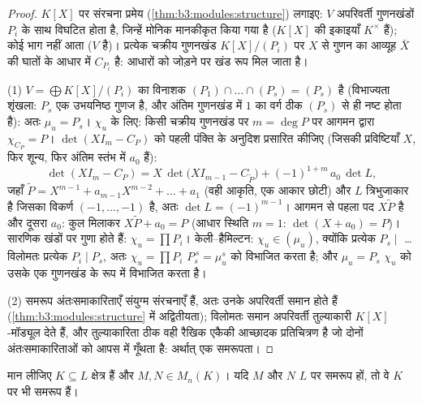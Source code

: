 \begin{proof}
 $K[X]$ पर संरचना प्रमेय (\cref{thm:b3:modules:structure}) लगाइए:  $V$
अपरिवर्ती गुणनखंडों $P_i$ के साथ विघटित होता है, जिन्हें मोनिक
मानकीकृत किया गया है ($K[X]$ की इकाइयाँ $K^\times$ हैं); कोई 
भाग नहीं आता ($V$  है)। प्रत्येक चक्रीय गुणनखंड $K[X]/(P_i)$ पर
$X$ से गुणन का आव्यूह $\bar X$ की घातों के आधार में $C_{P_i}$ है:
आधारों को जोड़ने पर खंड रूप मिल जाता है।

(1) $V = \bigoplus K[X]/(P_i)$ का विनाशक $(P_1)\cap
\dots\cap(P_s) = (P_s)$ है (विभाज्यता शृंखला: $P_s$ एक
उभयनिष्ठ गुणज है, और अंतिम गुणनखंड में $1$ का वर्ग ठीक $(P_s)$
से ही नष्ट होता है): अतः $\mu_u = P_s$। $\chi_u$ के लिए: किसी चक्रीय गुणनखंड
पर $m = \deg P$ पर आगमन द्वारा $\chi_{C_P} = P$। $\det(XI_m - C_P)$ को पहली पंक्ति के अनुदिश
प्रसारित कीजिए (जिसकी प्रविष्टियाँ $X$, फिर शून्य, फिर अंतिम
स्तंभ में $a_0$ हैं):
\[
\det(XI_m - C_P) = X\,\det\bigl(XI_{m-1} - C_{\tilde P}\bigr)
+ (-1)^{1+m}\,a_0\,\det L ,
\]
जहाँ $\tilde P = X^{m-1} + a_{m-1}X^{m-2} + \dots + a_1$ (वही आकृति, एक आकार छोटी) और $L$ त्रिभुजाकार है
जिसका विकर्ण $(-1, \dots, -1)$ है, अतः $\det L = (-1)^{m-1}$। आगमन से पहला पद $X\tilde P$ है और
दूसरा $a_0$: कुल मिलाकर $X\tilde P + a_0 = P$ (आधार स्थिति $m=1$: $\det(X + a_0) = P$)।
सारणिक खंडों पर गुणा होते हैं: $\chi_u = \prod P_i$। केली--हैमिल्टन: $\chi_u \in (\mu_u)$,
क्योंकि प्रत्येक $P_s \mid$ \dots विलोमतः प्रत्येक $P_i \mid P_s$, अतः $\chi_u = \prod P_i$
$P_s^{\,s} = \mu_u^s$ को विभाजित करता है; और $\mu_u =
P_s$ $\chi_u$ को उसके एक गुणनखंड के
रूप में विभाजित करता है।

(2) समरूप अंतःसमाकारिताएँ संयुग्म  संरचनाएँ हैं, अतः उनके
अपरिवर्ती समान होते हैं (\cref{thm:b3:modules:structure} में अद्वितीयता); विलोमतः समान
अपरिवर्ती तुल्याकारी $K[X]$-मॉड्यूल देते हैं, और 
तुल्याकारिता ठीक वही रैखिक एकैकी आच्छादक प्रतिचित्रण है जो दोनों
अंतःसमाकारिताओं को आपस में गूँथता है: अर्थात् एक समरूपता।
\end{proof}

\begin{corollary}[समरूपता क्षेत्र विस्तार के प्रति असंवेदी है]
\label{cor:b3:modules:descent}
मान लीजिए $K \subseteq L$ क्षेत्र हैं और $M, N \in M_n(K)$। यदि $M$ और $N$ $L$
पर समरूप हों, तो वे $K$ पर भी समरूप हैं।
\end{corollary}

